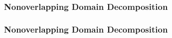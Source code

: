 \subsubsection{Nonoverlapping Domain Decomposition}
\begin{frame}
  \frametitle<presentation>{Nonoverlapping Domain Decomposition}

  \begin{columns}
    \begin{column}{0.6\linewidth}
    

\end{column}
\end{columns}
\end{frame}
